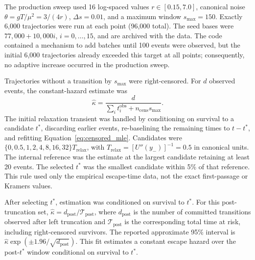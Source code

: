 \documentclass[a4paper,twocolumn,10pt]{article}
\begin{document}
The production sweep used 16 log-spaced values $r\in[0.15,7.0]$, canonical noise
$\theta=gT/\mu^2=3/(4r)$,
$\Delta s=0.01$, and a maximum window $s_{\max}=150$. Exactly 6,000 trajectories were run at each
point (96,000 total). The seed bases were $77{,}000+10{,}000i$, $i=0,\ldots,15$, and are archived
with the data. The code contained a mechanism to add batches until 100 events were observed, but
the initial 6,000 trajectories already exceeded this target at all points; consequently, no
adaptive increase occurred in the production sweep.

Trajectories without a transition by $s_{\max}$ were right-censored. For $d$ observed events, the
constant-hazard estimate was
\begin{equation}
\widehat\kappa=\frac{d}{\sum_i t_i^{\mathrm{obs}}+n_{\mathrm{cens}}s_{\max}}.
\label{eq:censored_mle}
\end{equation}
The initial relaxation transient was handled by conditioning on survival to a candidate $t^*$,
discarding earlier events, re-baselining the remaining times to $t-t^*$, and refitting
Equation~\eqref{eq:censored_mle}. Candidates were
$\{0,0.5,1,2,4,8,16,32\}T_{\mathrm{relax}}$, with
$T_{\mathrm{relax}}=[U''(y_-)]^{-1}=0.5$ in canonical units. The internal reference was the estimate at the largest
candidate retaining at least 20 events. The selected $t^*$ was the smallest candidate within 5\%
of that reference. This rule used only the empirical escape-time data, not the exact first-passage
or Kramers values.

After selecting $t^*$, estimation was conditioned on survival to $t^*$. For this post-truncation
set, $\widehat\kappa=d_{\mathrm{post}}/\mathcal{T}_{\mathrm{post}}$, where
$d_{\mathrm{post}}$ is the number of committed transitions observed after left truncation and
$\mathcal{T}_{\mathrm{post}}$ is the corresponding total time at risk, including right-censored
survivors. The reported approximate 95\% interval is
$\widehat\kappa\exp(\pm1.96/\sqrt{d_{\mathrm{post}}})$.
This fit estimates a constant escape hazard over the post-$t^*$ window conditional on survival
to $t^*$.
\end{document}
